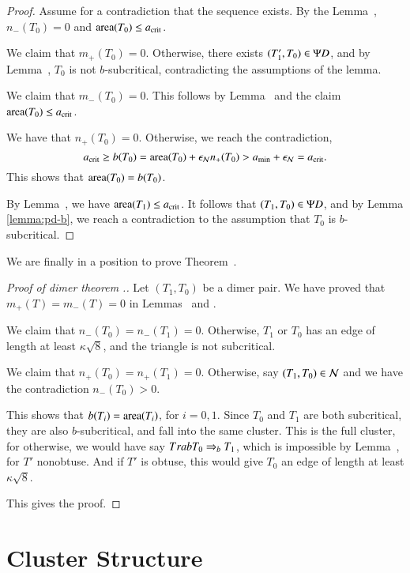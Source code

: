 \begin{proof}  
  Assume for a contradiction that the sequence exists.  By the
  Lemma~, $n_-(T_0)=0$ and ${\operatorname{area}}(T_0)\le a_\text{crit}$.

  We claim that $m_+(T_0)=0$.  Otherwise, there exists
  $(T'_1,T_0)\in\Psi D$, and by Lemma~, $T_0$ is not
  $b$-subcritical, contradicting the assumptions of the lemma.

  We claim that $m_-(T_0)=0$.  This follows by
  Lemma~ and the claim ${\operatorname{area}}(T_0)\le a_\text{crit}$.

We have that $n_+(T_0)=0$.  Otherwise, we reach the contradiction,
\[
a_\text{crit} \ge b(T_0) ={\operatorname{area}}(T_0) + \epsilon_{\mathcal N} n_+(T_0) > a_\text{min} + \epsilon_{\mathcal N} = a_\text{crit}.
\]
This shows that ${\operatorname{area}}(T_0) = b(T_0)$.

By Lemma~, we have ${\operatorname{area}}(T_1)\le a_\text{crit}$.
It follows that $(T_1,T_0)\in\Psi D$, and by Lemma \ref{lemma:pd-b},
we reach a contradiction to the assumption that $T_0$ is $b$-subcritical. 
\end{proof}
  
We are finally in a position to prove Theorem~.

\begin{proof}[Proof of dimer theorem .]
  Let $(T_1,T_0)$ be a dimer pair.  We have proved that
  $m_+(T)=m_-(T)=0$ in Lemmas~ and
  .

  We claim that $n_-(T_0)=n_-(T_1)=0$.  Otherwise, $T_1$ or $T_0$ has
  an edge of length at least $\kappa\sqrt8$, and the triangle is not
  subcritical.

  We claim that $n_+(T_0)=n_+(T_1)=0$.  Otherwise, say
  $(T_1,T_0)\in\mathcal N$ and we have the contradiction $n_-(T_0)>0$.

  This shows that $b(T_i)={\operatorname{area}}(T_i)$, for $i=0,1$.  Since $T_0$ and
  $T_1$ are both subcritical, they are also $b$-subcritical, and fall
  into the same cluster.  This is the full cluster, for otherwise, we
  would have say $T\\rab T_0\Rightarrow_{b} T_1$, which is impossible by
  Lemma~, for $T'$ nonobtuse.  And if $T'$ is
  obtuse, this would give $T_0$ an edge of length at least
  $\kappa\sqrt8$.

  This gives the proof.
\end{proof}


\section{Cluster Structure}


